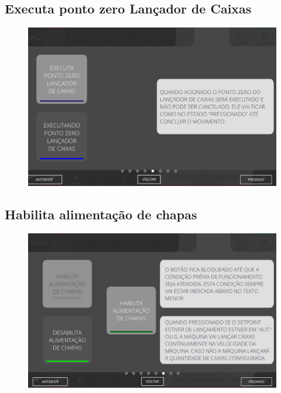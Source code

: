 \newpage
\thispagestyle{fancy}
\vspace*{40 pt}
\subsection{Executa ponto zero Lançador de Caixas}
\vspace*{\fill}
\begin{figure}[h]
    \centering
    \includegraphics[width=576 px,height=360 px]{src/imagesICV/03-feeder/commands/6.png}
\end{figure}
\vspace*{\fill}

\newpage
\thispagestyle{fancy}
\vspace*{40 pt}
\subsection{Habilita alimentação de chapas}
\vspace*{\fill}
\begin{figure}[h]
    \centering
    \includegraphics[width=576 px,height=360 px]{src/imagesICV/03-feeder/commands/7.png}
\end{figure}
\vspace*{\fill}

